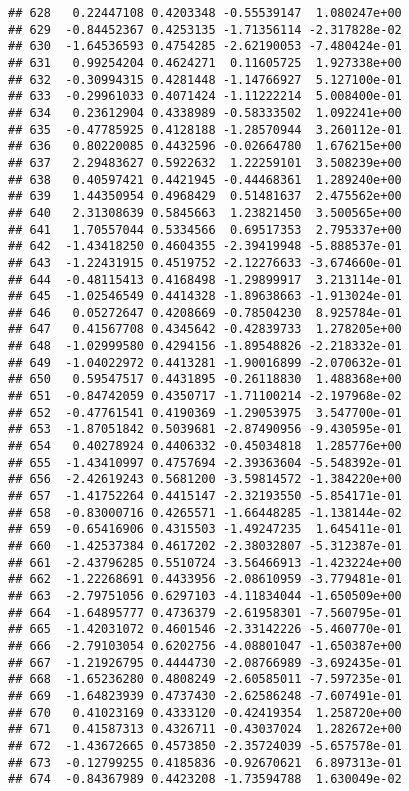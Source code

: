 \documentclass[
]{article}
\begin{document}
\begin{verbatim}
## 628   0.22447108 0.4203348 -0.55539147  1.080247e+00
## 629  -0.84452367 0.4253135 -1.71356114 -2.317828e-02
## 630  -1.64536593 0.4754285 -2.62190053 -7.480424e-01
## 631   0.99254204 0.4624271  0.11605725  1.927338e+00
## 632  -0.30994315 0.4281448 -1.14766927  5.127100e-01
## 633  -0.29961033 0.4071424 -1.11222214  5.008400e-01
## 634   0.23612904 0.4338989 -0.58333502  1.092241e+00
## 635  -0.47785925 0.4128188 -1.28570944  3.260112e-01
## 636   0.80220085 0.4432596 -0.02664780  1.676215e+00
## 637   2.29483627 0.5922632  1.22259101  3.508239e+00
## 638   0.40597421 0.4421945 -0.44468361  1.289240e+00
## 639   1.44350954 0.4968429  0.51481637  2.475562e+00
## 640   2.31308639 0.5845663  1.23821450  3.500565e+00
## 641   1.70557044 0.5334566  0.69517353  2.795337e+00
## 642  -1.43418250 0.4604355 -2.39419948 -5.888537e-01
## 643  -1.22431915 0.4519752 -2.12276633 -3.674660e-01
## 644  -0.48115413 0.4168498 -1.29899917  3.213114e-01
## 645  -1.02546549 0.4414328 -1.89638663 -1.913024e-01
## 646   0.05272647 0.4208669 -0.78504230  8.925784e-01
## 647   0.41567708 0.4345642 -0.42839733  1.278205e+00
## 648  -1.02999580 0.4294156 -1.89548826 -2.218332e-01
## 649  -1.04022972 0.4413281 -1.90016899 -2.070632e-01
## 650   0.59547517 0.4431895 -0.26118830  1.488368e+00
## 651  -0.84742059 0.4350717 -1.71100214 -2.197968e-02
## 652  -0.47761541 0.4190369 -1.29053975  3.547700e-01
## 653  -1.87051842 0.5039681 -2.87490956 -9.430595e-01
## 654   0.40278924 0.4406332 -0.45034818  1.285776e+00
## 655  -1.43410997 0.4757694 -2.39363604 -5.548392e-01
## 656  -2.42619243 0.5681200 -3.59814572 -1.384220e+00
## 657  -1.41752264 0.4415147 -2.32193550 -5.854171e-01
## 658  -0.83000716 0.4265571 -1.66448285 -1.138144e-02
## 659  -0.65416906 0.4315503 -1.49247235  1.645411e-01
## 660  -1.42537384 0.4617202 -2.38032807 -5.312387e-01
## 661  -2.43796285 0.5510724 -3.56466913 -1.423224e+00
## 662  -1.22268691 0.4433956 -2.08610959 -3.779481e-01
## 663  -2.79751056 0.6297103 -4.11834044 -1.650509e+00
## 664  -1.64895777 0.4736379 -2.61958301 -7.560795e-01
## 665  -1.42031072 0.4601546 -2.33142226 -5.460770e-01
## 666  -2.79103054 0.6202756 -4.08801047 -1.650387e+00
## 667  -1.21926795 0.4444730 -2.08766989 -3.692435e-01
## 668  -1.65236280 0.4808249 -2.60585011 -7.597235e-01
## 669  -1.64823939 0.4737430 -2.62586248 -7.607491e-01
## 670   0.41023169 0.4333120 -0.42419354  1.258720e+00
## 671   0.41587313 0.4326711 -0.43037024  1.282672e+00
## 672  -1.43672665 0.4573850 -2.35724039 -5.657578e-01
## 673  -0.12799255 0.4185836 -0.92670621  6.897313e-01
## 674  -0.84367989 0.4423208 -1.73594788  1.630049e-02

\end{verbatim}
\end{document}
